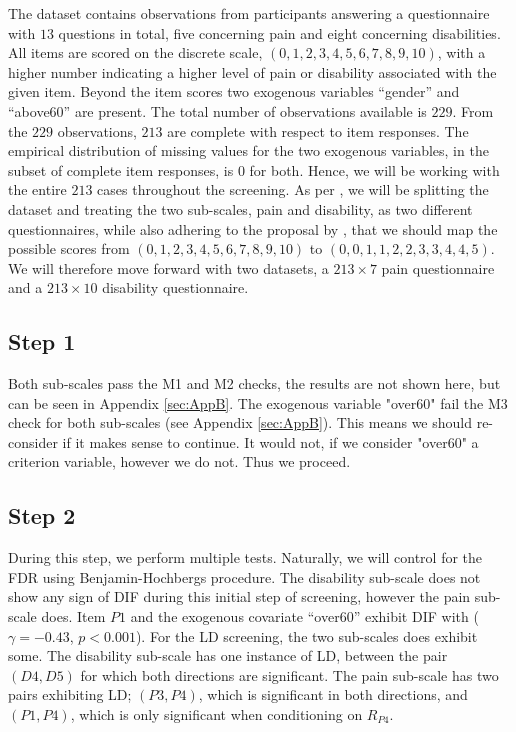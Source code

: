 \documentclass[a4project,12pt]{article}
\theoremstyle{examplestyle}
\theoremstyle{defstyle}
\theoremstyle{thmstyle}
\begin{document}
The dataset contains observations from participants answering a questionnaire with $13$ questions in total, five concerning pain and eight concerning disabilities. All items are scored on the discrete scale, $(0,1,2,3,4,5,6,7,8,9,10)$, with a higher number indicating a higher level of pain or disability associated with the given item. Beyond the item scores two exogenous variables ``gender'' and ``above60'' are present. The total number of observations available is $229$. From the $229$ observations, $213$ are complete with respect to item responses. The empirical distribution of missing values for the two exogenous variables, in the subset of complete item responses, is $0$ for both. Hence, we will be working with the entire $213$ cases throughout the screening. As per \cite{Christensen2018}, we will be splitting the dataset and treating the two sub-scales, pain and disability, as two different questionnaires, while also adhering to the proposal by \cite{Jerosch-Herold2017}, that we should map the possible scores from $(0,1,2,3,4,5,6,7,8,9,10)$ to $(0,0,1,1,2,2,3,3,4,4,5)$. We will therefore move forward with two datasets, a $213\times 7$ pain questionnaire and a $213\times 10$ disability questionnaire. 


\subsection{Step 1}
Both sub-scales pass the M1 and M2 checks, the results are not shown here, but can be seen in Appendix \ref{sec:AppB}. The exogenous variable "over60" fail the M3 check for both sub-scales (see Appendix \ref{sec:AppB}). This means we should re-consider if it makes sense to continue. It would not, if we consider "over60" a criterion variable, however we do not. Thus we proceed. 


\subsection{Step 2}
During this step, we perform multiple tests. Naturally, we will control for the FDR using Benjamin-Hochbergs procedure. The disability sub-scale does not show any sign of DIF during this initial step of screening, however the pain sub-scale does. Item $P1$ and the exogenous covariate ``over60'' exhibit DIF with ( $\gamma=-0.43$, $p<0.001$). For the LD screening, the two sub-scales does exhibit some. The disability sub-scale has one instance of LD, between the pair $(D4,D5)$ for which both directions are significant. The pain sub-scale has two pairs exhibiting LD; $(P3,P4)$, which is significant in both directions, and $(P1,P4)$, which is only significant when conditioning on $R_{P4}$. 
\end{document}
